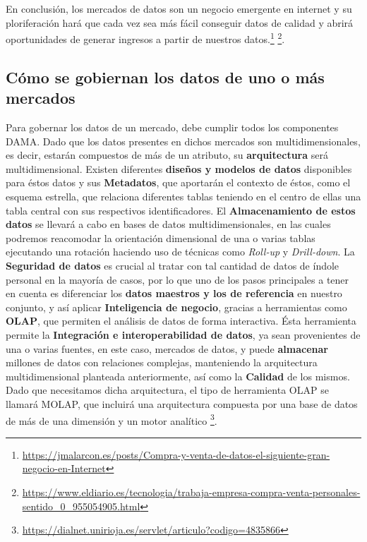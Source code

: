 \documentclass{article}
\begin{document}
En conclusión, los mercados de datos son un negocio emergente en internet y su ploriferación hará que cada vez sea más fácil conseguir datos de calidad y abrirá oportunidades de generar ingresos a partir de nuestros datos.\footnote{\url{https://jmalarcon.es/posts/Compra-y-venta-de-datos-el-siguiente-gran-negocio-en-Internet}} \footnote{\url{https://www.eldiario.es/tecnologia/trabaja-empresa-compra-venta-personales-sentido_0_955054905.html}}.


\subsection{Cómo se gobiernan los datos de uno o más mercados}
Para gobernar los datos de un mercado, debe cumplir todos los componentes DAMA. Dado que los datos presentes en dichos mercados son multidimensionales, es decir, estarán compuestos de más de un atributo, su \textbf{arquitectura} será multidimensional. Existen diferentes \textbf{diseños y modelos de datos} disponibles para éstos datos y sus \textbf{Metadatos}, que aportarán el contexto de éstos, como el esquema estrella, que relaciona diferentes tablas teniendo en el centro de ellas una tabla central con sus respectivos identificadores. El \textbf{Almacenamiento de estos datos} se llevará a cabo en bases de datos multidimensionales, en las cuales podremos reacomodar la orientación dimensional de una o varias tablas ejecutando una rotación haciendo uso de técnicas como \textit{Roll-up} y \textit{Drill-down}. La \textbf{Seguridad de datos} es crucial al tratar con tal cantidad de datos de índole personal en la mayoría de casos, por lo que uno de los pasos principales a tener en cuenta es diferenciar los \textbf{datos maestros y los de referencia} en nuestro conjunto, y así aplicar \textbf{Inteligencia de negocio}, gracias a herramientas como \textbf{OLAP}, que permiten el análisis de datos de forma interactiva. Ésta herramienta permite la \textbf{Integración e interoperabilidad de datos}, ya sean provenientes de una o varias fuentes, en este caso, mercados de datos, y puede \textbf{almacenar} millones de datos con relaciones complejas, manteniendo la arquitectura multidimensional planteada anteriormente, así como la \textbf{Calidad} de los mismos. Dado que necesitamos dicha arquitectura, el tipo de herramienta OLAP se llamará MOLAP, que incluirá una arquitectura compuesta por una base de datos de más de una dimensión y un motor analítico \footnote{\url{https://dialnet.unirioja.es/servlet/articulo?codigo=4835866}}.
\end{document}
